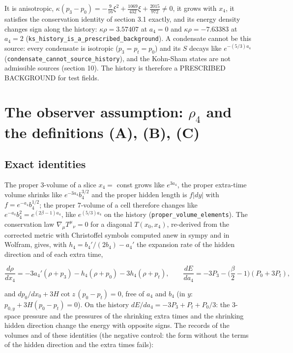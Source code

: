 \documentclass[11pt]{article}
\begin{document}
It is anisotropic, $\kappa(p_3 - p_0) = -\tfrac{9}{16}\xi^2 + \tfrac{1069}{432}\xi + \tfrac{2015}{972} \neq 0$, it grows with $x_4$, it satisfies the conservation identity of section 3.1 exactly, and its energy density changes sign along the history: $\kappa\rho = 3.57407$ at $a_4 = 0$ and $\kappa\rho = -7.63383$ at $a_4 = 2$ (\texttt{ks\_histo\allowbreak{}ry\_is\_a\_\allowbreak{}prescrib\allowbreak{}ed\_backg\allowbreak{}round}). A condensate cannot be this source: every condensate is isotropic ($p_3 = p_t = p_0$) and its $S$ decays like $e^{-(5/3)a_4}$ (\texttt{condensa\allowbreak{}te\_canno\allowbreak{}t\_source\allowbreak{}\_history}), and the Kohn-Sham states are not admissible sources (section 10). The history is therefore a PRESCRIBED BACKGROUND for test fields.

\section{The observer assumption: \texorpdfstring{$\rho_4$}{ρ\_4} and the definitions (A), (B), (C)}

\subsection{Exact identities}

The proper 3-volume of a slice $x_4 = $ const grows like $e^{3a_4}$, the proper extra-time volume shrinks like $e^{-3a_4}b_4^{3/2}$ and the proper hidden length is $f\lvert dy\rvert$ with $f = e^{-a_4}b_4^{1/2}$; the proper 7-volume of a cell therefore changes like $e^{-a_4}b_4^2 = e^{(2\beta - 1)a_4}$, like $e^{(5/3)a_4}$ on the history (\texttt{proper\_v\allowbreak{}olume\_el\allowbreak{}ements}). The conservation law $\nabla_\mu T^\mu{}_\nu = 0$ for a diagonal $T(x_0, x_4)$, re-derived from the corrected metric with Christoffel symbols computed anew in sympy and in Wolfram, gives, with $h_4 = b_4'/(2b_4) - a_4'$ the expansion rate of the hidden direction and of each extra time,

\[
\frac{d\rho}{dx_4} = -3a_4'(\rho + p_3) - h_4(\rho + p_0) - 3h_4(\rho + p_t),\qquad
\frac{dE}{da_4} = -3P_3 - \Big(\frac{\beta}{2} - 1\Big)(P_0 + 3P_t) ,
\]

and $dp_0/dx_0 + 3H\cot z\,(p_0 - p_t) = 0$, free of $a_4$ and $b_4$ (in $y$: $p_{0,y} + 3H(p_0 - p_t) = 0$). On the history $dE/da_4 = -3P_3 + P_t + P_0/3$: the 3-space pressure and the pressures of the shrinking extra times and the shrinking hidden direction change the energy with opposite signs. The records of the volumes and of these identities (the negative control: the form without the terms of the hidden direction and the extra times fails):
\end{document}
